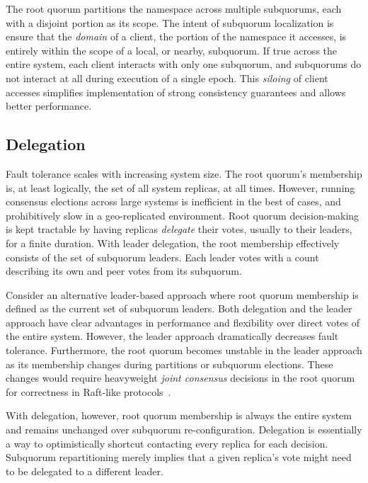 The root quorum partitions the namespace across multiple subquorums, each with a disjoint portion as its scope.
The intent of subquorum localization is ensure that the \emph{domain} of a client, the portion of the namespace it accesses, is entirely within the scope of a local, or nearby, subquorum.
If true across the entire system, each client interacts with only one subquorum, and subquorums do not interact at all during execution of a single epoch.
This \emph{siloing} of client accesses simplifies implementation of strong consistency guarantees and allows better performance.

\subsection{Delegation}
\label{ch03_delegation}

Fault tolerance scales with increasing system size.
The root quorum's membership is, at least logically, the set of all system replicas, at all times.
However, running consensus elections across large systems is inefficient in the best of cases, and prohibitively slow in a geo-replicated environment.
Root quorum decision-making is kept tractable by having replicas \emph{delegate} their votes, usually to their leaders, for a finite duration.
With leader delegation, the root membership effectively consists of the set of subquorum leaders.
Each leader votes with a count describing its own and peer votes from its
subquorum.

Consider an alternative leader-based approach where root quorum membership is defined as the current set of subquorum leaders.
Both delegation and the leader approach have clear advantages in performance and flexibility over direct votes of the entire system.
However, the leader approach dramatically decreases fault tolerance.
Furthermore, the root quorum becomes unstable in the leader approach as its membership changes during partitions or subquorum elections.
These changes would require heavyweight \emph{joint consensus} decisions in the root quorum for correctness in Raft-like protocols~\cite{raft}.

With delegation, however, root quorum membership is always the entire system and remains unchanged over subquorum re-configuration.
Delegation is essentially a way to optimistically shortcut contacting every replica for each decision.
Subquorum repartitioning merely implies that a given replica's vote might need to be delegated to a different leader.

